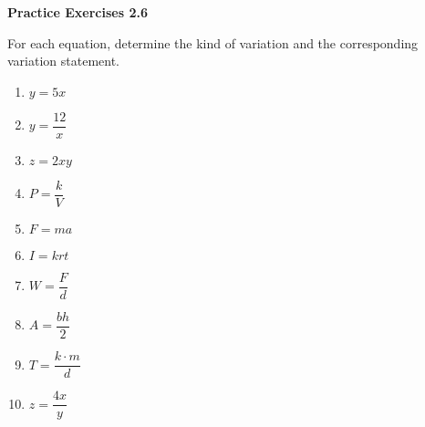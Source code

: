 \vspace{0.3ex}
\noindent\textbf{Practice Exercises 2.6}

\vspace{0.2ex}

 For each equation, determine the kind of variation and the corresponding variation statement.
\begin{multicols}{3}
\begin{enumerate}[noitemsep, label = \color{blue}\arabic*. ]
    \item $y = 5x$
    
    \item $y = \dfrac{12}{x}$
    
    \item $z = 2xy$
    
    \item $P = \dfrac{k}{V}$
    
    \item $F = ma$
    
    \item $I = krt$
    
    \item $W = \dfrac{F}{d}$
    
    \item $A = \dfrac{bh}{2}$
    
    \item $T = \dfrac{k \cdot m}{d}$
    
    \item $z = \dfrac{4x}{y}$
\end{enumerate}
\end{multicols}
